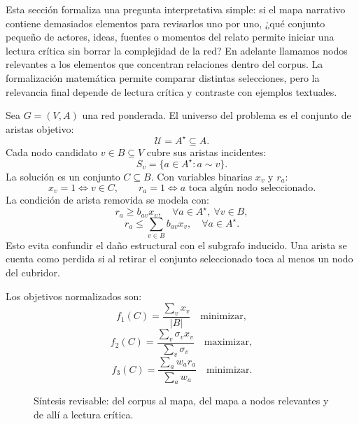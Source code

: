\documentclass[11pt]{article}
\begin{document}
Esta sección formaliza una pregunta interpretativa simple: si el mapa narrativo
contiene demasiados elementos para revisarlos uno por uno, ¿qué conjunto pequeño
de actores, ideas, fuentes o momentos del relato permite iniciar una lectura
crítica sin borrar la complejidad de la red? En adelante llamamos nodos
relevantes a los elementos que concentran relaciones dentro del corpus. La
formalización matemática permite comparar distintas selecciones, pero la
relevancia final depende de lectura crítica y contraste con ejemplos textuales.

Sea \(G=(V,A)\) una red ponderada. El universo del problema es el conjunto de
aristas objetivo:
\[
{\mathcal U}=A^\star\subseteq A.
\]
Cada nodo candidato \(v\in B\subseteq V\) cubre sus aristas incidentes:
\[
S_v=\{a\in A^\star:a\sim v\}.
\]
La solución es un conjunto \(C\subseteq B\). Con variables binarias \(x_v\) y
\(r_a\):
\[
x_v=1\Leftrightarrow v\in C,\qquad
r_a=1\Leftrightarrow a\text{ toca algún nodo seleccionado}.
\]
La condición de arista removida se modela con:
\[
r_a\geq b_{av}x_v,\quad \forall a\in A^\star,\ \forall v\in B,
\]
\[
r_a\leq\sum_{v\in B}b_{av}x_v,\quad \forall a\in A^\star.
\]
Esto evita confundir el daño estructural con el subgrafo inducido. Una arista se
cuenta como perdida si al retirar el conjunto seleccionado toca al menos un nodo
del cubridor.

Los objetivos normalizados son:
\[
f_1(C)=\frac{\sum_v x_v}{|B|}\quad \text{minimizar},
\]
\[
f_2(C)=\frac{\sum_v\sigma_vx_v}{\sum_v\sigma_v}\quad \text{maximizar},
\]
\[
f_3(C)=\frac{\sum_a w_ar_a}{\sum_a w_a}\quad \text{minimizar}.
\]

\begin{figure}[ht]
\centering
{}
\caption{Síntesis revisable: del corpus al mapa, del mapa a nodos relevantes y de allí a lectura crítica.}
\label{fig:sintesis}
\end{figure}
\end{document}
